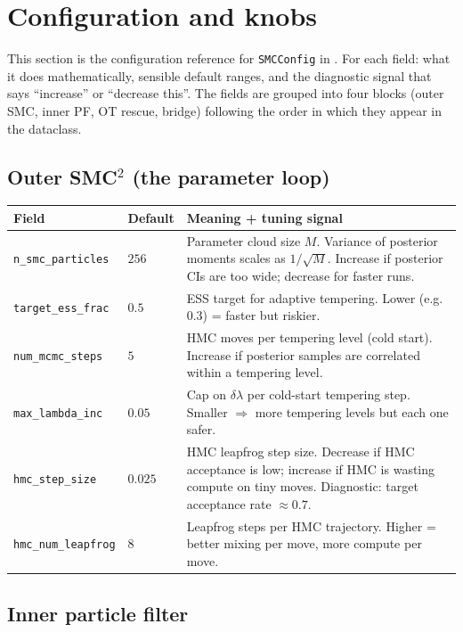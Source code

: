 \section{Configuration and knobs} \label{sec:config}

This section is the configuration reference for \texttt{SMCConfig}
in . For each field: what it does
mathematically, sensible default ranges, and the diagnostic signal
that says ``increase'' or ``decrease this''. The fields are grouped
into four blocks (outer SMC, inner PF, OT rescue, bridge) following
the order in which they appear in the dataclass.

\subsection{Outer SMC$^2$ (the parameter loop)}

\begin{center}\small
\begin{longtable}{lp{3cm}p{8cm}}
\toprule
Field & Default & Meaning + tuning signal \\
\midrule
\endhead
\texttt{n\_smc\_particles}    & $256$  & Parameter cloud size $M$. Variance of posterior moments scales as $1/\sqrt{M}$. Increase if posterior CIs are too wide; decrease for faster runs. \\
\texttt{target\_ess\_frac}     & $0.5$  & ESS target for adaptive tempering. Lower (e.g.\ $0.3$) = faster but riskier. \\
\texttt{num\_mcmc\_steps}     & $5$    & HMC moves per tempering level (cold start). Increase if posterior samples are correlated within a tempering level. \\
\texttt{max\_lambda\_inc}      & $0.05$ & Cap on $\delta\lambda$ per cold-start tempering step. Smaller $\Rightarrow$ more tempering levels but each one safer. \\
\midrule
\texttt{hmc\_step\_size}      & $0.025$ & HMC leapfrog step size. Decrease if HMC acceptance is low; increase if HMC is wasting compute on tiny moves. Diagnostic: target acceptance rate $\approx 0.7$. \\
\texttt{hmc\_num\_leapfrog}   & $8$    & Leapfrog steps per HMC trajectory. Higher = better mixing per move, more compute per move. \\
\bottomrule
\end{longtable}
\end{center}

\subsection{Inner particle filter}

